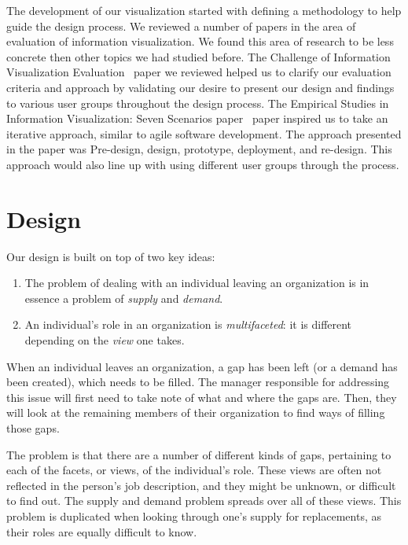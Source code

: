 \documentclass[journal]{vgtc}                %
\begin{document}
The development of our visualization started with defining a methodology to help guide the design process.  We reviewed a number of papers in the area of evaluation of information visualization.  We found this area of research to be less concrete then other topics we had studied before.  The Challenge of Information Visualization Evaluation~\cite{challengeofinfoviseval} paper we reviewed helped us to clarify our evaluation criteria and approach by validating our desire to present our design and findings to various user groups throughout the design process.  The Empirical Studies in Information Visualization: Seven Scenarios paper~\cite{lam2012empirical} paper inspired us to take an iterative approach, similar to agile software development.  The approach presented in the paper was Pre-design, design, prototype, deployment, and re-design.  This approach would also line up with using different user groups through the process.

\section{Design}
\label{sec:design}

Our design is built on top of two key ideas:

\begin{enumerate}
\item The problem of dealing with an individual leaving an organization is in essence a problem of \emph{supply} and \emph{demand}. 
\item An individual's role in an organization is \emph{multifaceted}: it is different depending on the \emph{view} one takes.
\end{enumerate}

When an individual leaves an organization, a gap has been left (or a demand has been created), which needs to be filled. The manager responsible for addressing this issue will first need to take note of what and where the gaps are. Then, they will look at the remaining members of their organization to find ways of filling those gaps.

The problem is that there are a number of different kinds of gaps, pertaining to each of the facets, or views, of the individual's role. These views are often not reflected in the person's job description, and they might be unknown, or difficult to find out. The supply and demand problem spreads over all of these views. This problem is duplicated when looking through one's supply for replacements, as their roles are equally difficult to know.
\end{document}
